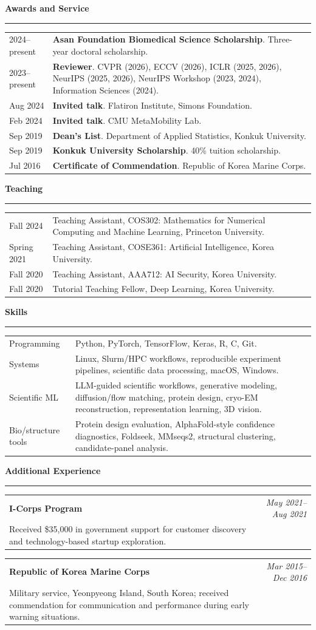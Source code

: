 \documentclass[10pt,letterpaper]{article}
\makeatletter
\newcommand{\cvsection}[1]{%
  \vspace{8pt}
  {\large\bfseries\color{accent} #1}\par
  \vspace{2pt}\hrule\vspace{5pt}
}
\newcommand{\entry}[4]{%
  \begin{tabularx}{\textwidth}{@{}>{\raggedright\arraybackslash}X r@{}}
    \textbf{#1} & \textit{#2}\\
    #3 & #4
  \end{tabularx}\vspace{2pt}
}
\makeatother
\begin{document}
\cvsection{Awards and Service}
\begin{tabularx}{\textwidth}{@{}p{2.45cm}>{\raggedright\arraybackslash}X@{}}
2024--present & \textbf{Asan Foundation Biomedical Science Scholarship}. Three-year doctoral scholarship.\\
2023--present & \textbf{Reviewer}. CVPR (2026), ECCV (2026), ICLR (2025, 2026), NeurIPS (2025, 2026), NeurIPS Workshop (2023, 2024), Information Sciences (2024).\\
Aug 2024 & \textbf{Invited talk}. Flatiron Institute, Simons Foundation.\\
Feb 2024 & \textbf{Invited talk}. CMU MetaMobility Lab.\\
Sep 2019 & \textbf{Dean's List}. Department of Applied Statistics, Konkuk University.\\
Sep 2019 & \textbf{Konkuk University Scholarship}. 40\% tuition scholarship.\\
Jul 2016 & \textbf{Certificate of Commendation}. Republic of Korea Marine Corps.\\
\end{tabularx}

\cvsection{Teaching}
\begin{tabularx}{\textwidth}{@{}p{2.45cm}>{\raggedright\arraybackslash}X@{}}
Fall 2024 & Teaching Assistant, COS302: Mathematics for Numerical Computing and Machine Learning, Princeton University.\\
Spring 2021 & Teaching Assistant, COSE361: Artificial Intelligence, Korea University.\\
Fall 2020 & Teaching Assistant, AAA712: AI Security, Korea University.\\
Fall 2020 & Tutorial Teaching Fellow, Deep Learning, Korea University.\\
\end{tabularx}

\cvsection{Skills}
\begin{tabularx}{\textwidth}{@{}p{2.45cm}>{\raggedright\arraybackslash}X@{}}
Programming & Python, PyTorch, TensorFlow, Keras, R, C, Git.\\
Systems & Linux, Slurm/HPC workflows, reproducible experiment pipelines, scientific data processing, macOS, Windows.\\
Scientific ML & LLM-guided scientific workflows, generative modeling, diffusion/flow matching, protein design, cryo-EM reconstruction, representation learning, 3D vision.\\
Bio/structure tools & Protein design evaluation, AlphaFold-style confidence diagnostics, Foldseek, MMseqs2, structural clustering, candidate-panel analysis.\\
\end{tabularx}

\cvsection{Additional Experience}
\entry{I-Corps Program}{May 2021--Aug 2021}{Received \$35,000 in government support for customer discovery and technology-based startup exploration.}{}
\entry{Republic of Korea Marine Corps}{Mar 2015--Dec 2016}{Military service, Yeonpyeong Island, South Korea; received commendation for communication and performance during early warning situations.}{}
\end{document}
